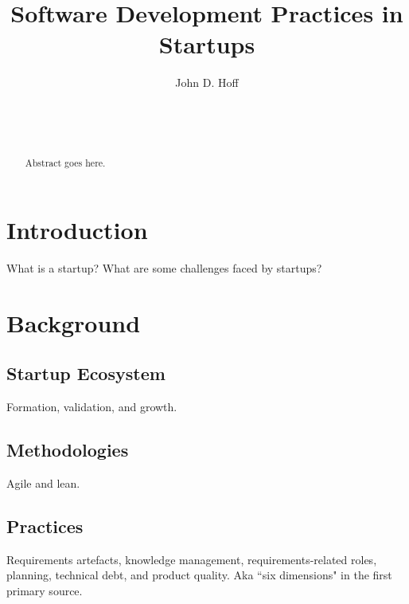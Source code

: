 \documentclass{sig-alternate}
\begin{document}

\title{Software Development Practices in Startups}


\author{
\alignauthor
John D. Hoff\\
	\\
	\\
	\\
}

\maketitle
\begin{abstract}
Abstract goes here.

\end{abstract}


\section{Introduction}
\label{sec:introduction}
What is a startup? What are some challenges faced by startups?

\section{Background}
\label{sec:background}

\subsection{Startup Ecosystem}
\label{sec:startupEcosystem}
Formation, validation, and growth.

\subsection{Methodologies}
\label{sec:methodologies}
Agile and lean.

\subsection{Practices}
\label{sec:practices}
Requirements artefacts, knowledge management, requirements-related roles, planning, technical debt, and product quality. Aka ``six dimensions" in the first primary source.
\end{document}

